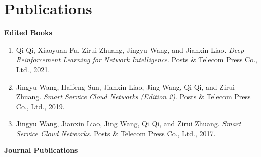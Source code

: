 \documentclass[letterpaper,11pt]{article}
\newcommand{\contentlength}{5.5in}
\begin{document}
	\section{\textbf{Publications}}
	\begin{tcolorbox}[flush right,breakable,colback=white,colframe=white,width=\contentlength]
		\textbf{Edited Books}
		\begin{enumerate}[itemsep=0mm]
			\item Qi Qi, Xiaoyuan Fu, Zirui Zhuang, Jingyu Wang, and Jianxin Liao. \textit{Deep Reinforcement Learning for Network Intelligence}. Posts \& Telecom Press Co., Ltd., 2021.
			\item Jingyu Wang, Haifeng Sun, Jianxin Liao, Jing Wang, Qi Qi, and Zirui Zhuang. \textit{Smart Service Cloud Networks (Edition 2)}. Posts \& Telecom Press Co., Ltd., 2019.
			\item Jingyu Wang, Jianxin Liao, Jing Wang, Qi Qi, and Zirui Zhuang. \textit{Smart Service Cloud Networks}. Posts \& Telecom Press Co., Ltd., 2017.
		\end{enumerate}
	
		\textbf{Journal Publications}
		

\end{tcolorbox}
\end{document}
